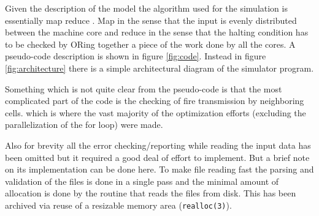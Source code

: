 \documentclass[Lau]{sapthesis} %
\begin{document}
Given the description of the model the algorithm used for the simulation is
essentially map reduce \cite{sac}. Map in the sense that the input is evenly
distributed between the machine core and reduce in the sense that the halting
condition has to be checked by ORing together a piece of the work done by all
the cores. A pseudo-code description is shown in figure \ref{fig:code}. Instead
in figure \ref{fig:architecture} there is a simple architectural diagram of the
simulator program.

Something which is not quite clear from the pseudo-code is that the most
complicated part of the code is the checking of fire transmission by neighboring
cells. which is where the vast majority of the optimization efforts (excluding
the parallelization of the for loop) were made.

Also for brevity all the error checking/reporting while reading the input data
has been omitted but it required a good deal of effort to implement. But a brief
note on its implementation can be done here. To make file reading fast the
parsing and validation of the files is done in a single pass and the minimal
amount of allocation is done by the routine that reads the files from disk. This
has been archived via reuse of a resizable memory area (\texttt{realloc(3)}).
\end{document}
